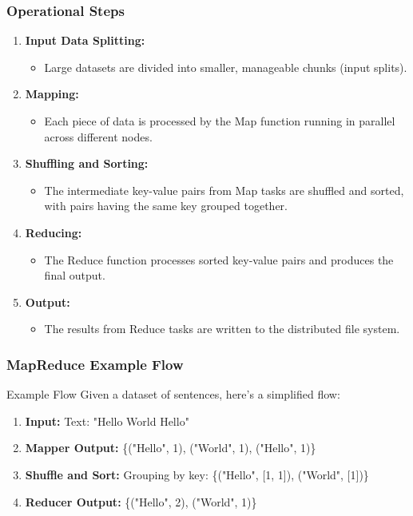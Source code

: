 \documentclass[aspectratio=169]{beamer}
\begin{document}
\begin{frame}[fragile]
  \frametitle{Operational Steps}
  \begin{enumerate}
    \item \textbf{Input Data Splitting:}
    \begin{itemize}
      \item Large datasets are divided into smaller, manageable chunks (input splits).
    \end{itemize}

    \item \textbf{Mapping:}
    \begin{itemize}
      \item Each piece of data is processed by the Map function running in parallel across different nodes.
    \end{itemize}

    \item \textbf{Shuffling and Sorting:}
    \begin{itemize}
      \item The intermediate key-value pairs from Map tasks are shuffled and sorted, with pairs having the same key grouped together.
    \end{itemize}

    \item \textbf{Reducing:}
    \begin{itemize}
      \item The Reduce function processes sorted key-value pairs and produces the final output.
    \end{itemize}

    \item \textbf{Output:}
    \begin{itemize}
      \item The results from Reduce tasks are written to the distributed file system.
    \end{itemize}
  \end{enumerate}
\end{frame}

\begin{frame}[fragile]
  \frametitle{MapReduce Example Flow}
  \begin{block}{Example Flow}
    Given a dataset of sentences, here’s a simplified flow:
    \begin{enumerate}
      \item \textbf{Input:} Text: "Hello World Hello"
      \item \textbf{Mapper Output:} \{("Hello", 1), ("World", 1), ("Hello", 1)\}
      \item \textbf{Shuffle and Sort:} Grouping by key: \{("Hello", [1, 1]), ("World", [1])\}
      \item \textbf{Reducer Output:} \{("Hello", 2), ("World", 1)\}
    \end{enumerate}
  \end{block}
\end{frame}
\end{document}

